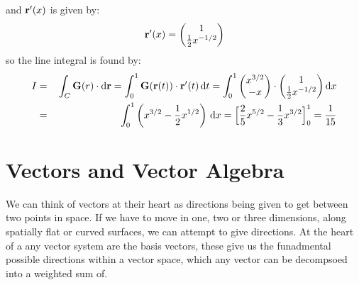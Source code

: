\documentclass[letterpaper,10pt,english]{jupyterBook}
\begin{document}
\sphinxAtStartPar
and \({\bf r'}(x)\) is given by:
\begin{equation*}
\begin{split}{\bf r}'(x) = \begin{pmatrix} 1 \\ \frac{1}{2} x^{-1/2} \end{pmatrix}\end{split}
\end{equation*}
\sphinxAtStartPar
so the line integral is found by:
\begin{equation*}
\begin{split}I &=&\, \int_C {\bf G}(r) \cdot \mathrm{d}{\bf r} = \int_0^1 {\bf G}({\bf r}(t)) \cdot {\bf r}'(t)\,\mathrm{d}t = 
\int_0^1 \begin{pmatrix} x^{3/2} \\ -x \end{pmatrix} \cdot \begin{pmatrix} 1 \\ \frac{1}{2} x^{-1/2} \end{pmatrix} \mathrm{d}x \\
&=&\, \int_0^1 \left( x^{3/2} - \frac{1}{2}x^{1/2} \right)\,\textrm{d}x = \Big[\frac{2}{5}x^{5/2} - \frac{1}{3}x^{3/2} \Big ]_0^1 = \frac{1}{15}
\end{split}
\end{equation*}

\chapter{Vectors and Vector Algebra}
\label{\detokenize{VectorCalculus/vectoralgebra:vectors-and-vector-algebra}}\label{\detokenize{VectorCalculus/vectoralgebra::doc}}
\sphinxAtStartPar
We can think of vectors at their heart as directions being given to get between two points in space.  If we have to move in one, two or three dimensions, along spatially flat or curved surfaces,
we can attempt to give directions.  At the heart of a any vector system are the basis vectors, these give us the funadmental possible directions within a vector space, which any vector can be
decompsoed into a weighted sum of.
\end{document}
